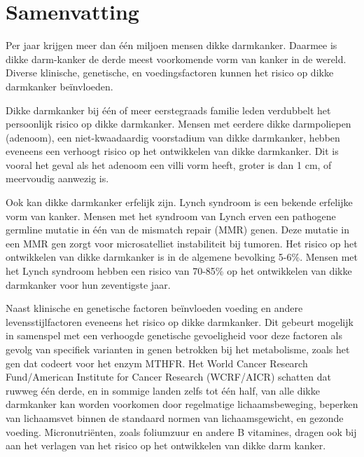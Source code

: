 \chapter*{Samenvatting}
\label{samenvatting}


\newpage

\noindent Per jaar krijgen meer dan \'e\'en miljoen mensen dikke darmkanker. Daarmee is dikke darm-kanker de derde meest voorkomende vorm van kanker in de wereld. Diverse klinische, genetische, en voedingsfactoren kunnen het risico op dikke darmkanker be\"invloeden.

\noindent Dikke darmkanker bij \'e\'en of meer eerstegraads familie leden verdubbelt het persoonlijk risico op dikke darmkanker. Mensen met eerdere dikke darmpoliepen (adenoom), een niet-kwaadaardig voorstadium van dikke darmkanker, hebben eveneens een verhoogt risico op het ontwikkelen van dikke darmkanker. Dit is vooral het geval als het adenoom een villi vorm heeft, groter is dan 1 cm, of meervoudig aanwezig is.

\noindent Ook kan dikke darmkanker erfelijk zijn. Lynch syndroom is een bekende erfelijke vorm van kanker. Mensen met het syndroom van Lynch erven een pathogene germline mutatie in \'e\'en van de mismatch repair (MMR) genen. Deze mutatie in een MMR gen zorgt voor microsatelliet instabiliteit bij tumoren. Het risico op het ontwikkelen van dikke darmkanker is in de algemene bevolking 5-6\%. Mensen met het Lynch syndroom hebben een risico van 70-85\% op het ontwikkelen van dikke darmkanker voor hun zeventigste jaar.

\noindent Naast klinische en genetische factoren be\"invloeden voeding en andere levensstijlfactoren eveneens het risico op dikke darmkanker. Dit gebeurt mogelijk in samenspel met een verhoogde genetische gevoeligheid voor deze factoren als gevolg van specifiek varianten in genen betrokken bij het metabolisme, zoals het gen dat codeert voor het enzym MTHFR. Het World Cancer Research Fund/American Institute for Cancer Research (WCRF/AICR) schatten dat ruwweg \'e\'en derde, en in sommige landen zelfs tot \'e\'en half, van alle dikke darmkanker kan worden voorkomen door regelmatige lichaamsbeweging, beperken van lichaamsvet binnen de standaard normen van lichaamsgewicht, en gezonde voeding. Micronutri\"enten, zoals foliumzuur en andere B vitamines, dragen ook bij aan het verlagen van het risico op het ontwikkelen van dikke darm kanker.


